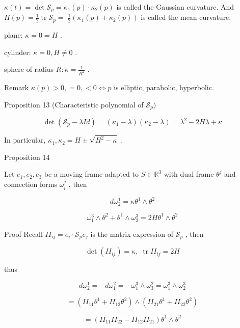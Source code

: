 \documentclass[lang=cn,a4paper,11pt,openany,twoside]{elegantbook}
\begin{document}
\(\kappa \left( t\right)  = \det {\mathcal{S}}_{p} = {\kappa }_{1}\left( p\right)  \cdot  {\kappa }_{2}\left( p\right)\) is called the Gaussian curvature. And \(H\left( p\right)  = \frac{1}{2}\operatorname{tr}{\mathcal{S}}_{p} = \; \frac{1}{2}\left( {{\kappa }_{1}\left( p\right)  + {\kappa }_{2}\left( p\right) }\right)\) is called the mean curvature.

plane: \(\kappa  = 0 = H\) .

cylinder: \(\kappa  = 0,H \neq  0\) .

sphere of radius \(R : \kappa  = \frac{1}{{R}^{2}}\) .

Remark \(\kappa \left( p\right)  > 0, = 0, < 0 \Leftrightarrow  p\) is elliptic, parabolic, hyperbolic.

Proposition 13 (Characteristic polynomial of \({\mathcal{S}}_{p})\)

\[
\det \left( {{\mathcal{S}}_{p} - {\lambda Id}}\right)  = \left( {{\kappa }_{1} - \lambda }\right) \left( {{\kappa }_{2} - \lambda }\right)  = {\lambda }^{2} - {2H\lambda } + \kappa
\]

In particular, \({\kappa }_{1},{\kappa }_{2} = H \pm  \sqrt{{H}^{2} - \kappa }\) .

Proposition 14

Let \({e}_{1},{e}_{2},{e}_{3}\) be a moving frame adapted to \(S \in  {\mathbb{R}}^{3}\) with dual frame \({\theta }^{j}\) and connection forms \({\omega }_{i}^{j}\) , then

\[
d{\omega }_{2}^{1} = \kappa {\theta }^{1} \land  {\theta }^{2} \tag{11.1}
\]

\[
{\omega }_{1}^{3} \land  {\theta }^{2} + {\theta }^{1} \land  {\omega }_{2}^{3} = {2H}{\theta }^{1} \land  {\theta }^{2} \tag{11.2}
\]

Proof Recall \(I{I}_{ij} = {e}_{i} \cdot  {\mathcal{S}}_{p}{e}_{j}\) is the matrix expression of \({\mathcal{S}}_{p}\) , then

\[
\det \left( {I{I}_{ij}}\right)  = \kappa ,\;\operatorname{tr}I{I}_{ij} = {2H}
\]

thus

\[
d{\omega }_{2}^{1} =  - d{\omega }_{1}^{2} =  - {\omega }_{1}^{3} \land  {\omega }_{3}^{2} = {\omega }_{1}^{3} \land  {\omega }_{2}^{3}
\]

\[
= \left( {I{I}_{11}{\theta }^{1} + I{I}_{12}{\theta }^{2}}\right)  \land  \left( {I{I}_{21}{\theta }^{1} + I{I}_{22}{\theta }^{2}}\right)
\]

\[
= \left( {I{I}_{11}I{I}_{22} - I{I}_{12}I{I}_{21}}\right) {\theta }^{1} \land  {\theta }^{2}
\]
\end{document}
